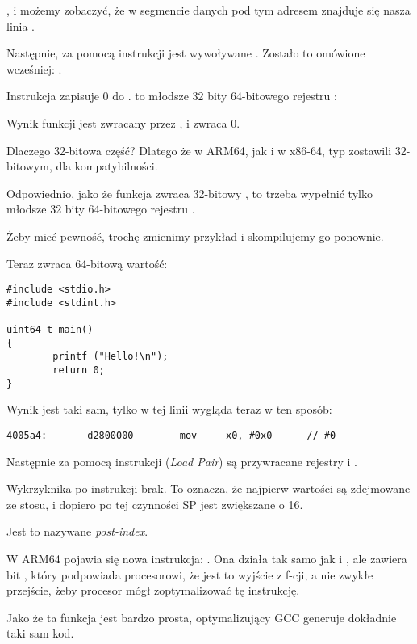 , i możemy zobaczyć, że w segmencie danych  pod tym adresem znajduje się nasza
linia .

Następnie, za pomocą instrukcji  jest wywoływane \puts. Zostało to omówione wcześniej: .

Instrukcja \MOV zapisuje 0 do . 
 to młodsze 32 bity 64-bitowego rejestru :



Wynik funkcji jest zwracany przez , i \main zwraca 0.

Dlaczego 32-bitowa część?
Dlatego że w ARM64, jak i w x86-64, typ \Tint zostawili 32-bitowym, dla kompatybilności.

Odpowiednio, jako że funkcja zwraca 32-bitowy \Tint, to trzeba wypełnić tylko młodsze 32 bity 64-bitowego rejestru .

Żeby mieć pewność, trochę zmienimy przykład i skompilujemy go ponownie.%

Teraz \main zwraca 64-bitową wartość:

\begin{lstlisting}[caption=\main zwracające wartość typu \TT{uint64\_t},style=customc]
#include <stdio.h>
#include <stdint.h>

uint64_t main()
{
        printf ("Hello!\n");
        return 0;
}
\end{lstlisting}

Wynik jest taki sam, tylko \MOV w tej linii wygląda teraz w ten sposób:

\begin{lstlisting}[caption=\NonOptimizing GCC 4.8.1 + objdump]
  4005a4:       d2800000        mov     x0, #0x0      // #0
\end{lstlisting}

Następnie za pomocą instrukcji  (\emph{Load Pair}) są przywracane rejestry  i .

Wykrzyknika po instrukcji brak. To oznacza, że najpierw wartości są zdejmowane ze stosu, i dopiero po tej czynności \ac{SP} jest zwiększane o 16.

Jest to nazywane \emph{post-index}.

W ARM64 pojawia się nowa instrukcja: \RET. 
Ona działa tak samo jak i , ale zawiera bit ,
który podpowiada procesorowi, że jest to wyjście z f-cji, a nie zwykłe przejście, żeby procesor mógł zoptymalizować tę instrukcję.

Jako że ta funkcja jest bardzo prosta, optymalizujący GCC generuje dokładnie taki sam kod.



